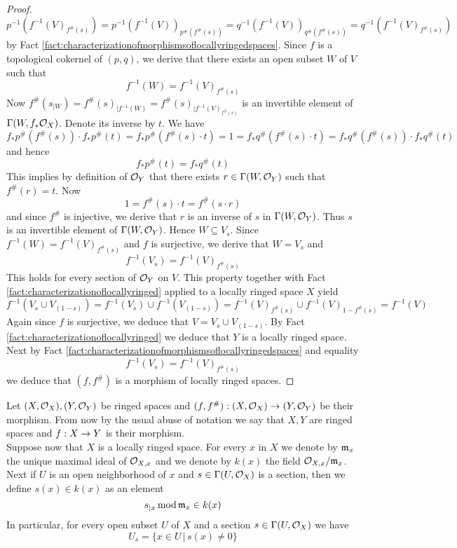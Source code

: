 \begin{proof}
$$p^{-1}\left(f^{-1}(V)_{f^{\#}(s)}\right) = p^{-1}\left(f^{-1}(V)\right)_{p^{\#}(f^{\#}(s))} = q^{-1}\left(f^{-1}(V)\right)_{q^{\#}(f^{\#}(s))} =  q^{-1}\left(f^{-1}(V)_{f^{\#}(s)}\right)$$
by Fact \ref{fact:characterizationofmorphismsoflocallyringedspaces}. Since $f$ is a topological cokernel of $(p,q)$, we derive that there exists an open subset $W$ of $V$ such that
$$f^{-1}(W) = f^{-1}(V)_{f^{\#}(s)}$$
Now $f^{\#}(s_{\mid W}) = f^{\#}(s)_{\mid f^{-1}(W)} = f^{\#}(s)_{\mid f^{-1}(V)_{f^{\#}(s)}}$ is an invertible element of $\Gamma(W,f_*{\mathcal O}_X)$. Denote its inverse by $t$. We have
$$f_*p^{\#}(f^{\#}(s))\cdot f_*p^{\#}(t) = f_*p^{\#}(f^{\#}(s)\cdot t) = 1 = f_*q^{\#}(f^{\#}(s)\cdot t) = f_*q^{\#}(f^{\#}(s))\cdot f_*q^{\#}(t)$$ 
and hence
$$f_*p^{\#}(t) = f_*q^{\#}(t)$$
This implies by definition of ${\mathcal O}_Y$ that there exists $r\in \Gamma(W,{\mathcal O}_Y)$ such that $f^{\#}(r) = t$. Now
$$1 = f^{\#}(s)\cdot t = f^{\#}(s\cdot r)$$
and since $f^{\#}$ is injective, we derive that $r$ is an inverse of $s$ in $\Gamma(W,{\mathcal O}_Y)$. Thus $s$ is an invertible element of $\Gamma(W,{\mathcal O}_Y)$. Hence $W\subseteq V_s$. Since $f^{-1}(W) = f^{-1}(V)_{f^{\#}(s)}$ and $f$ is surjective, we derive that $W = V_s$ and
$$f^{-1}(V_s) = f^{-1}(V)_{f^{\#}(s)}$$
This holds for every section of ${\mathcal O}_Y$ on $V$. This property together with Fact \ref{fact:characterizationoflocallyringed} applied to a locally ringed space $X$ yield
$$f^{-1}\left(V_s\cup V_{(1-s)}\right)= f^{-1}(V_s)\cup f^{-1}(V_{(1-s)}) = f^{-1}(V)_{f^{\#}(s)}\cup f^{-1}(V)_{1-f^{\#}(s)} = f^{-1}(V)$$
Again since $f$ is surjective, we deduce that $V = V_s\cup V_{(1-s)}$. By Fact \ref{fact:characterizationoflocallyringed} we deduce that $Y$ is a locally ringed space. Next by Fact \ref{fact:characterizationofmorphismsoflocallyringedspaces} and equality
$$f^{-1}(V_s) = f^{-1}(V)_{f^{\#}(s)}$$
we deduce that $(f,f^{\#})$ is a morphism of locally ringed spaces.
\end{proof}
\noindent
Let $(X,{\mathcal O}_X),(Y,{\mathcal O}_Y)$ be ringed spaces and $(f,f^{\#}):(X,{\mathcal O}_X)\rightarrow (Y,{\mathcal O}_Y)$ be their morphism. From now by the usual abuse of notation we say that $X,Y$ are ringed spaces and $f:X\rightarrow Y$ is their morphism.\\
Suppose now that $X$ is a locally ringed space. For every $x$ in $X$ we denote by $\mathfrak{m}_x$ the unique maximal ideal of ${\mathcal O}_{X,x}$ and we denote by $k(x)$ the field ${\mathcal O}_{X,x}/\mathfrak{m}_x$. Next if $U$ is an open neighborhood of $x$ and $s\in \Gamma(U,{\mathcal O}_X)$ is a section, then we define $s(x)\in k(x)$ as an element $$s_{\mid x}\,\mathrm{mod}\,\mathfrak{m}_x\in k(x)$$
In particular, for every open subset $U$ of $X$ and a section $s\in \Gamma(U,{\mathcal O}_X)$ we have
$$U_s = \{x\in U\,|\,s(x)\neq 0\}$$

